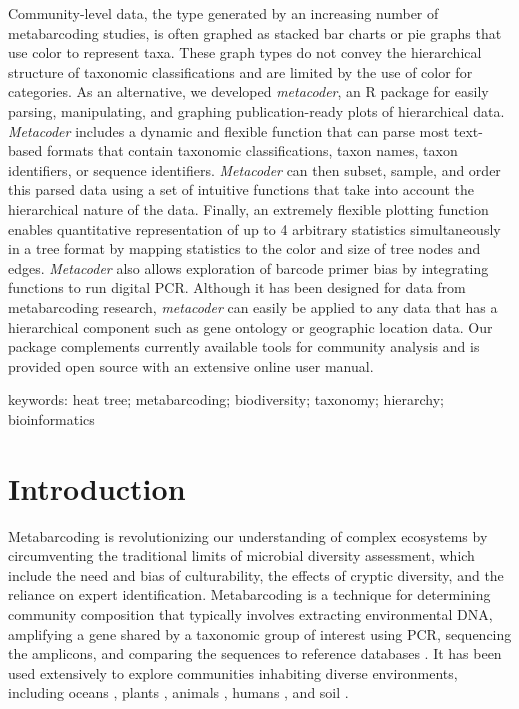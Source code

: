 \documentclass[10pt,letterpaper]{article}
\begin{document}
Community-level data, the type generated by an increasing number of
metabarcoding studies, is often graphed as stacked bar charts or pie
graphs that use color to represent taxa. These graph types do not convey
the hierarchical structure of taxonomic classifications and are limited
by the use of color for categories. As an alternative, we developed
\emph{metacoder}, an R package for easily parsing, manipulating, and
graphing publication-ready plots of hierarchical data. \emph{Metacoder}
includes a dynamic and flexible function that can parse most text-based
formats that contain taxonomic classifications, taxon names, taxon
identifiers, or sequence identifiers. \emph{Metacoder} can then subset,
sample, and order this parsed data using a set of intuitive functions
that take into account the hierarchical nature of the data. Finally, an
extremely flexible plotting function enables quantitative representation
of up to 4 arbitrary statistics simultaneously in a tree format by
mapping statistics to the color and size of tree nodes and edges.
\emph{Metacoder} also allows exploration of barcode primer bias by
integrating functions to run digital PCR. Although it has been designed
for data from metabarcoding research, \emph{metacoder} can easily be
applied to any data that has a hierarchical component such as gene
ontology or geographic location data. Our package complements currently
available tools for community analysis and is provided open source with
an extensive online user manual.

keywords: heat tree; metabarcoding; biodiversity; taxonomy; hierarchy;
bioinformatics

\linenumbers


\section*{Introduction}\label{introduction}

Metabarcoding is revolutionizing our understanding of complex ecosystems
by circumventing the traditional limits of microbial diversity
assessment, which include the need and bias of culturability, the
effects of cryptic diversity, and the reliance on expert identification.
Metabarcoding is a technique for determining community composition that
typically involves extracting environmental DNA, amplifying a gene
shared by a taxonomic group of interest using PCR, sequencing the
amplicons, and comparing the sequences to reference databases
\cite{cristescu2014barcoding}. It has been used extensively to explore
communities inhabiting diverse environments, including oceans
\cite{de2015eukaryotic}, plants \cite{coleman2016plant}, animals
\cite{yu2012biodiversity}, humans \cite{human2012structure}, and soil
\cite{gilbert2014earth}.
\end{document}
